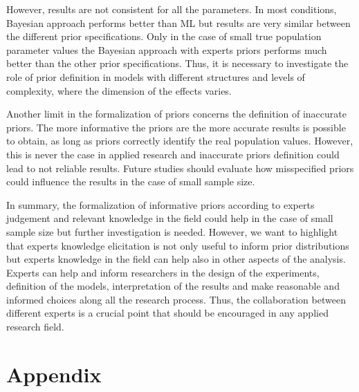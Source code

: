 \documentclass[graybox]{svmult}
\begin{document}
However, results are not consistent for all the parameters. In most conditions, Bayesian approach performs better than ML but results are very similar between the different prior specifications. Only in the case of small true population parameter values the Bayesian approach with experts priors performs much better than the other prior specifications. Thus, it is necessary to investigate the role of prior definition in models with different structures and levels of complexity, where the dimension of the effects varies.

Another limit in the formalization of priors concerns the definition of inaccurate priors. The more informative the priors are the more accurate results is possible to obtain, as long as priors correctly identify the real population values. However, this is never the case in applied research and inaccurate priors definition could lead to not reliable results. Future studies should evaluate how misspecified priors could influence the results in the case of small sample size. 

In summary, the formalization of informative priors according to experts judgement and relevant knowledge in the field could help in the case of small sample size but further investigation is needed. However, we want to highlight that experts knowledge elicitation is not only useful to inform prior distributions but experts knowledge in the field can help also in other aspects of the analysis. Experts can help and inform researchers in the design of the experiments, definition of the models, interpretation of the results and make reasonable and informed choices along all the research process. Thus, the collaboration between different experts is a crucial point that should be encouraged in any applied research field.

\clearpage 

\section*{Appendix}
\label{sec: apendix}
\end{document}

